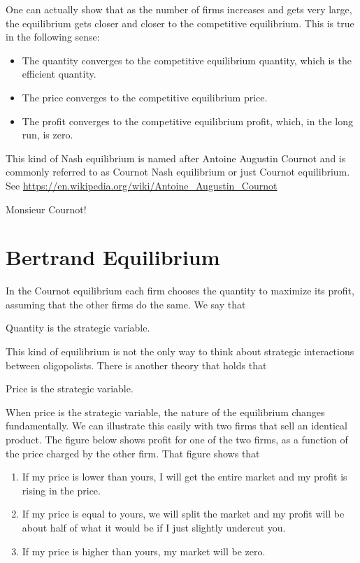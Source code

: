 \documentclass[
]{book}
\providecommand{\tightlist}{%
  \setlength{\itemsep}{0pt}\setlength{\parskip}{0pt}}
\begin{document}
One can actually show that as the number of firms increases and gets very large, the equilibrium gets closer and closer to the competitive equilibrium. This is true in the following sense:

\begin{itemize}
\tightlist
\item
  The quantity converges to the competitive equilibrium quantity, which is the efficient quantity.
\item
  The price converges to the competitive equilibrium price.
\item
  The profit converges to the competitive equilibrium profit, which, in the long run, is zero.
\end{itemize}

This kind of Nash equilibrium is named after Antoine Augustin Cournot and is commonly referred to as Cournot Nash equilibrium or just Cournot equilibrium. See \url{https://en.wikipedia.org/wiki/Antoine_Augustin_Cournot}

Monsieur Cournot!

\hypertarget{bertrand-equilibrium}{%
\section{Bertrand Equilibrium}\label{bertrand-equilibrium}}

In the Cournot equilibrium each firm chooses the quantity to maximize its profit, assuming that the other firms do the same. We say that

\begin{center}
Quantity is the strategic variable.

\end{center}

This kind of equilibrium is not the only way to think about strategic interactions between oligopolists. There is another theory that holds that

\begin{center}
Price is the strategic variable.

\end{center}

When price is the strategic variable, the nature of the equilibrium changes fundamentally. We can illustrate this easily with two firms that sell an identical product. The figure below shows profit for one of the two firms, as a function of the price charged by the other firm. That figure shows that

\begin{enumerate}
\def\labelenumi{\arabic{enumi}.}
\tightlist
\item
  If my price is lower than yours, I will get the entire market and my profit is rising in the price.
\item
  If my price is equal to yours, we will split the market and my profit will be about half of what it would be if I just slightly undercut you.
\item
  If my price is higher than yours, my market will be zero.
\end{enumerate}
\end{document}
